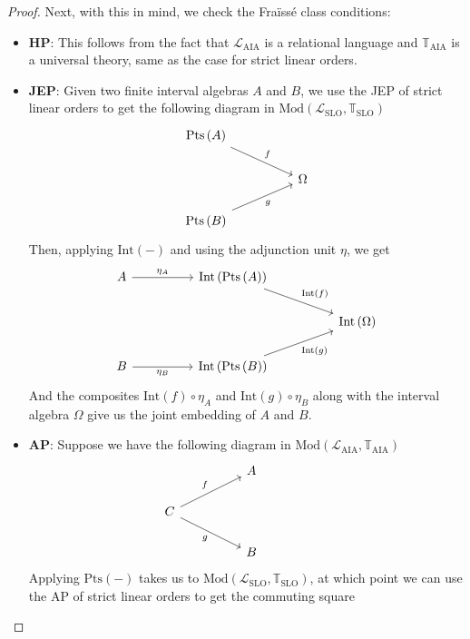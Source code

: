 \documentclass[11pt %
              ]{article}
\newcommand{\unit}[1]{\eta_{#1}}
\newcommand{\lang}{\mathcal{L}}
\newcommand{\theory}{\mathbb{T}}
\newcommand{\lslo}{\lang_\text{SLO}}
\newcommand{\tslo}{\theory_\text{SLO}}
\newcommand{\laia}{\lang_\text{AIA}}
\newcommand{\taia}{\theory_\text{AIA}}
\newcommand{\mods}[2]{\text{Mod}\left(#1,#2\right)}
\newcommand{\aias}{\mods{\laia}{\taia}}
\newcommand{\slos}{\mods{\lslo}{\tslo}}
\newcommand{\inter}[1][-]{\text{Int}\left(#1\right)}
\newcommand{\points}[1][-]{\text{Pts}\left(#1\right)}
\theoremstyle{plain}
\theoremstyle{definition}
\theoremstyle{remark}
\begin{document}
\begin{proof}
  Next, with this in mind, we check the Fraïssé class conditions:
  \begin{itemize}
    \item \textbf{HP}: This follows from the fact that $\laia$ is a relational language and
      $\taia$ is a universal theory, same as the case for strict linear orders.
    \item \textbf{JEP}: Given two finite interval algebras $A$ and $B$, we use the JEP of strict
      linear orders to get the following diagram in $\slos$
      \[\begin{tikzcd}
        {\points[A]} \\
        && \Omega \\
        {\points[B]}
        \arrow["f", from=1-1, to=2-3]
        \arrow["g"', from=3-1, to=2-3]
      \end{tikzcd}\]
      Then, applying $\inter$ and using the adjunction unit $\eta$, we get
      \[\begin{tikzcd}
        A && {\inter[\points[A]]} \\
        &&&& {\inter[\Omega]} \\
        B && {\inter[\points[B]]}
        \arrow["{\inter[f]}", from=1-3, to=2-5]
        \arrow["{\inter[g]}"', from=3-3, to=2-5]
        \arrow["{\unit{B}}"', from=3-1, to=3-3]
        \arrow["{\unit{A}}", from=1-1, to=1-3]
      \end{tikzcd}\]
      And the composites $\inter[f] \circ \unit{A}$ and $\inter[g] \circ \unit{B}$ along with
      the interval algebra $\Omega$ give us the joint embedding of $A$ and $B$.
    \item \textbf{AP}: Suppose we have the following diagram in $\aias$
      \[\begin{tikzcd}
        && A \\
        C &&&& {} \\
        && B
        \arrow["f", from=2-1, to=1-3]
        \arrow["g"', from=2-1, to=3-3]
      \end{tikzcd}\]
      Applying $\points$ takes us to $\slos$, at which point we can use the AP of strict linear 
      orders to get the commuting square

\end{itemize}
\end{proof}
\end{document}
